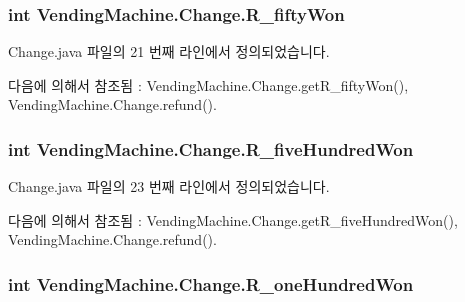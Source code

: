 \subsubsection[{\texorpdfstring{R\+\_\+fifty\+Won}{R_fiftyWon}}]{\setlength{\rightskip}{0pt plus 5cm}int Vending\+Machine.\+Change.\+R\+\_\+fifty\+Won\hspace{0.3cm}{\ttfamily [private]}}\hypertarget{class_vending_machine_1_1_change_a4e21e933b5ee7b25ebb7318af485de4e}{}\label{class_vending_machine_1_1_change_a4e21e933b5ee7b25ebb7318af485de4e}


Change.\+java 파일의 21 번째 라인에서 정의되었습니다.



다음에 의해서 참조됨 \+:  Vending\+Machine.\+Change.\+get\+R\+\_\+fifty\+Won(), Vending\+Machine.\+Change.\+refund().

\subsubsection[{\texorpdfstring{R\+\_\+five\+Hundred\+Won}{R_fiveHundredWon}}]{\setlength{\rightskip}{0pt plus 5cm}int Vending\+Machine.\+Change.\+R\+\_\+five\+Hundred\+Won\hspace{0.3cm}{\ttfamily [private]}}\hypertarget{class_vending_machine_1_1_change_a37aebab952ad10a6c3a97d525eb20012}{}\label{class_vending_machine_1_1_change_a37aebab952ad10a6c3a97d525eb20012}


Change.\+java 파일의 23 번째 라인에서 정의되었습니다.



다음에 의해서 참조됨 \+:  Vending\+Machine.\+Change.\+get\+R\+\_\+five\+Hundred\+Won(), Vending\+Machine.\+Change.\+refund().

\subsubsection[{\texorpdfstring{R\+\_\+one\+Hundred\+Won}{R_oneHundredWon}}]{\setlength{\rightskip}{0pt plus 5cm}int Vending\+Machine.\+Change.\+R\+\_\+one\+Hundred\+Won\hspace{0.3cm}{\ttfamily [private]}}\hypertarget{class_vending_machine_1_1_change_a03ee38bdf926f63d3d537d54b6dd6c85}{}\label{class_vending_machine_1_1_change_a03ee38bdf926f63d3d537d54b6dd6c85}


